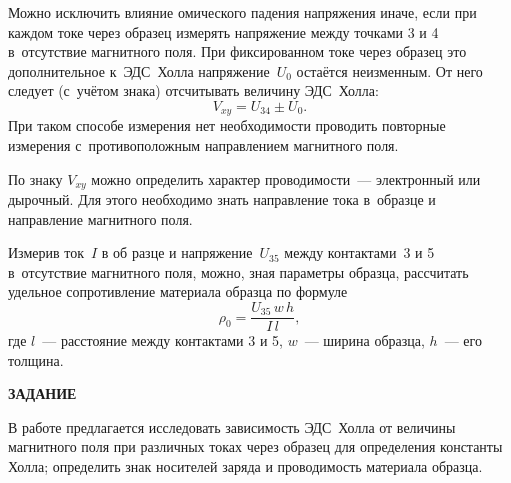 Можно исключить влияние омического падения напряжения иначе, если при каждом токе через образец измерять напряжение
между точками 3 и 4 в~отсутствие магнитного поля. При фиксированном токе через образец это дополнительное к~ЭДС~Холла напряжение~$U_0$ остаётся неизменным. От него следует (с~учётом знака) отсчитывать величину ЭДС~Холла:
\begin{equation}
V_{xy}=U_{34}\pm U_0.
\label{eq3.4.1}
\end{equation}
При таком способе измерения нет необходимости проводить повторные измерения с~противоположным направлением магнитного поля.

По знаку $V_{xy}$ можно определить характер проводимости~--- электронный или дырочный. Для этого необходимо знать
направление тока в~образце и направление магнитного поля.

Измерив ток~$I$ в об
разце и напряжение~$U_{35}$ между контактами~3 и 5 в~отсутствие магнитного поля, можно, зная
параметры образца, рассчитать удельное сопротивление материала образца по формуле
\begin{equation}
\rho_0=\frac{U_{35}\,w\,h}{I\, l},
\label{eq3.4.2}
\end{equation}
где $l$~--- расстояние между контактами 3 и 5, $w$~--- ширина образца, $h$~--- его толщина.

{\Large \bf ЗАДАНИЕ}

В работе предлагается исследовать зависимость ЭДС~Холла от величины магнитного поля при различных токах через образец для определения константы Холла; определить знак носителей заряда и проводимость материала образца.

